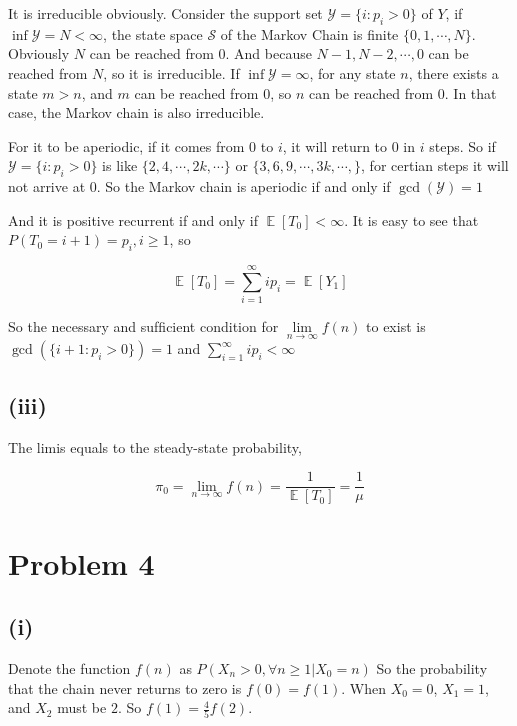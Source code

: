 \documentclass{article}
\DeclareMathOperator{\E}{\mathbb{E}}
\begin{document}
It is irreducible obviously. Consider the support set $\mathcal{Y}=\{i:p_i >0 \} $ of $Y$, if $\inf \mathcal{Y} = N < \infty$, the state space $\mathcal{S}$ of the Markov Chain is finite $\{0,1,\cdots,N\}$. Obviously $N$ can be reached from $0$.  And because $N-1,N-2,\cdots,0$ can be reached from $N$, so it is irreducible. If $\inf \mathcal{Y} =  \infty$, for any state $n$, there exists a state $m>n$, and  $m$ can be reached from $0$, so $n$ can be reached from $0$. In that case, the Markov chain is also irreducible.

For it to be aperiodic, if it comes from 0 to $i$, it will return to 0 in $i$ steps. So if $\mathcal{Y}=\{i:p_i >0 \} $ is like $\{2,4,\cdots,2k,\cdots\}$ or $\{3,6,9,\cdots,3k,\cdots,\}$, for certian steps it will not arrive at $0$. So the Markov chain is aperiodic if and only if $\operatorname{gcd}(\mathcal{Y} ) = 1$

And it is positive recurrent if and only if $\E[T_0] < \infty$. It is easy to see that $P(T_0 = i+1) = p_i, i\geqslant 1$, so 

\begin{equation}
    \E[T_0] = \sum_{i=1}^{\infty} ip_i = \E[Y_1] 
\end{equation}

So the necessary and sufﬁcient condition for $\lim\limits_{n\to\infty} f(n)$ to exist is $\operatorname{gcd}(\{i+1: p_i >0\}) = 1$ and $\sum_{i=1}^{\infty} ip_i  < \infty$

\subsection{(iii)}

The limis equals to the steady-state probability, 

\begin{equation}
    \pi_0 = \lim_{n\to\infty} f(n) = \frac{1}{\E[T_0]} = \frac{1}{\mu}
\end{equation}

\section{Problem 4}

\subsection{(i)}

Denote the function $f(n)$ as $P(X_n >0, \forall n\geqslant 1 | X_0 = n)$ So the probability that the chain never returns to zero is $f(0) = f(1)$. When $X_0=0$, $X_1=1$, and  $X_2$ must be $2$. So $f(1) = \frac{4}{5}f(2)$.
\end{document}
